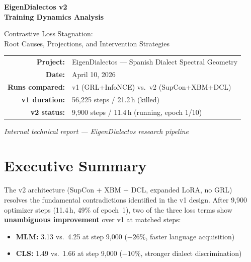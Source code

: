 \documentclass[11pt,a4paper]{article}
\begin{document}
\begin{titlepage}
\centering
\vspace*{3cm}
{\Huge\bfseries\color{blue!70!black} EigenDialectos v2\\[0.3em]
Training Dynamics Analysis\par}
\vspace{1.5cm}
{\Large Contrastive Loss Stagnation:\\
Root Causes, Projections, and Intervention Strategies\par}
\vspace{2cm}
{\large
\begin{tabular}{rl}
\textbf{Project:} & EigenDialectos --- Spanish Dialect Spectral Geometry \\
\textbf{Date:} & April 10, 2026 \\
\textbf{Runs compared:} & v1 (GRL+InfoNCE) vs.\ v2 (SupCon+XBM+DCL) \\
\textbf{v1 duration:} & 56{,}225 steps / 21.2\,h (killed) \\
\textbf{v2 status:} & 9{,}900 steps / 11.4\,h (running, epoch 1/10) \\
\end{tabular}
\par}
\vspace{3cm}
{\small\textit{Internal technical report --- EigenDialectos research pipeline}}
\end{titlepage}

\tableofcontents
\newpage

\section{Executive Summary}

The v2 architecture (SupCon + XBM + DCL, expanded LoRA, no GRL) resolves the
fundamental contradictions identified in the v1 design. After 9{,}900 optimizer
steps (11.4\,h, 49\% of epoch~1), two of the three loss terms show
\textbf{unambiguous improvement} over v1 at matched steps:

\begin{itemize}[nosep]
  \item \textbf{MLM:} 3.13 vs.\ 4.25 at step 9{,}000 ($-26\%$, faster language acquisition)
  \item \textbf{CLS:} 1.49 vs.\ 1.66 at step 9{,}000 ($-10\%$, stronger dialect discrimination)
\end{itemize}
\end{document}
